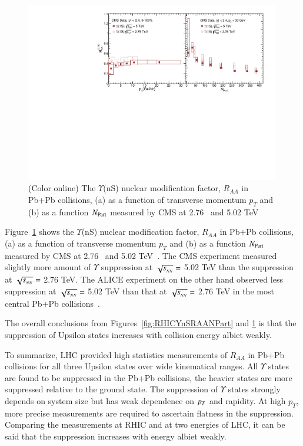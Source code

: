 \begin{figure}
  \includegraphics[width=0.99\textwidth]{Figures/Fig9_CMS_Y1SRAAPtNPart_En.pdf}
  \caption{(Color online) The $\Upsilon$(nS) nuclear modification factor, $R_{AA}$ in
    Pb+Pb collisions,
    (a) as a function of transverse momentum $p_{T}$
    and (b) as a function $N_{\rm Part}$ measured by CMS 
    at 2.76~\cite{Khachatryan:2016xxp} and 5.02 TeV~\cite{CMS:2018zza}
  }
  \label{fig:LHCYnSRAAenergy}
\end{figure}




Figure~\ref{fig:LHCYnSRAAenergy} shows 
the $\Upsilon$(nS) nuclear modification factor, $R_{AA}$ in Pb+Pb collisions,
(a) as a function of transverse momentum $p_{T}$
  and (b) as a function $N_{\rm Part}$ measured by CMS
    at 2.76~\cite{Khachatryan:2016xxp} and 5.02 TeV~\cite{CMS:2018zza}. 
 The CMS experiment measured slightly more amount of $\Upsilon$ suppression at
 $\sqrt{s_{_{NN}}} =$ 5.02 TeV than the suppression at $\sqrt{s_{_{NN}}} =$ 2.76 TeV.
 The ALICE experiment on the other hand observed less
suppression at $\sqrt{s_{_{NN}}} =$ 5.02 TeV than that at $\sqrt{s_{_{NN}}} =$ 2.76 TeV 
in the most central Pb+Pb collisions~\cite{ALICE:2018wzm,Abelev:2014nua}.

The overall conclusions from Figures~\ref{fig:RHICYnSRAANPart} and 
\ref{fig:LHCYnSRAAenergy} is that the suppression of Upsilon states
increases with collision energy albiet weakly. 
  
To summarize, LHC provided high statistics measurements of $R_{AA}$ in
Pb+Pb collisions for all three Upsilon states over wide kinematical ranges.
All $\Upsilon$ states are found to be suppressed in the Pb+Pb collisions,
the heavier states are more suppressed relative to the ground state.
The suppression of $\Upsilon$ states strongly depends on system size but
has weak dependence on $p_{T}$ and rapidity. At high $p_T$, more precise
measurements are required to ascertain flatness in the suppression. 
Comparing the measurements at RHIC and at two energies of LHC, it can be
said that the suppression increases with energy albiet weakly. 

